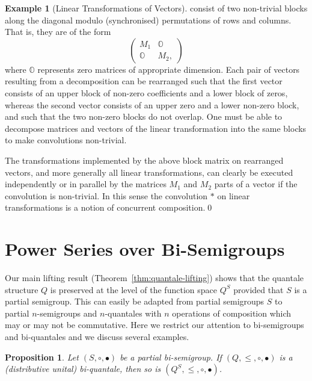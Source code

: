 \documentclass[12pt]{article}
\newtheorem{proposition}{Proposition}
\theoremstyle{definition}
\newtheorem{example}{Example}
\begin{document}
\begin{example}[Linear Transformations of Vectors]
consist of two non-trivial blocks along the diagonal modulo
(synchronised) permutations of rows and columns. That is, they are of
the form
\begin{equation*}
  \begin{pmatrix}
    M_1 & \mathbb{O}\\
\mathbb{O} & M_2,
  \end{pmatrix}
\end{equation*}
where $\mathbb{O}$ represents zero matrices of appropriate
dimension. Each pair of vectors resulting from a decomposition can be
rearranged such that the first vector consists of an upper block of
non-zero coefficients and a lower block of zeros, whereas the second
vector consists of an upper zero and a lower non-zero block, and such
that the two non-zero blocks do not overlap. One must be able to
decompose matrices and vectors of the linear transformation into the
same blocks to make convolutions non-trivial.

The transformations implemented by the above block matrix on
rearranged vectors, and more generally all linear transformations, can
clearly be executed independently or in parallel by the matrices $M_1$
and $M_2$ parts of a vector if the convolution is non-trivial.  In
this sense the convolution $\ast$ on linear transformations is a
notion of concurrent composition.\qed
\end{example}



\section{Power Series over Bi-Semigroups}
\label{sec:formal-power-series}

Our main lifting result (Theorem~\ref{thm:quantale-lifting}) shows
that the quantale structure $Q$ is preserved at the level of the
function space $Q^S$ provided that $S$ is a partial semigroup.
This can easily be adapted from partial semigroups $S$ to partial
$n$-semigroups and $n$-quantales with $n$ operations of composition
which may or may not be commutative. Here we restrict our attention to
bi-semigroups and bi-quantales and we discuss several examples.
\begin{proposition}\label{prop:biquantale-lifting}
  Let $(S,\circ,\bullet)$ be a partial bi-semigroup. If
  $(Q,\le,\circ,\bullet)$ is a (distributive unital) bi-quantale, then so is
  $(Q^S,\le,\circ,\bullet)$.
\end{proposition}
\end{document}
